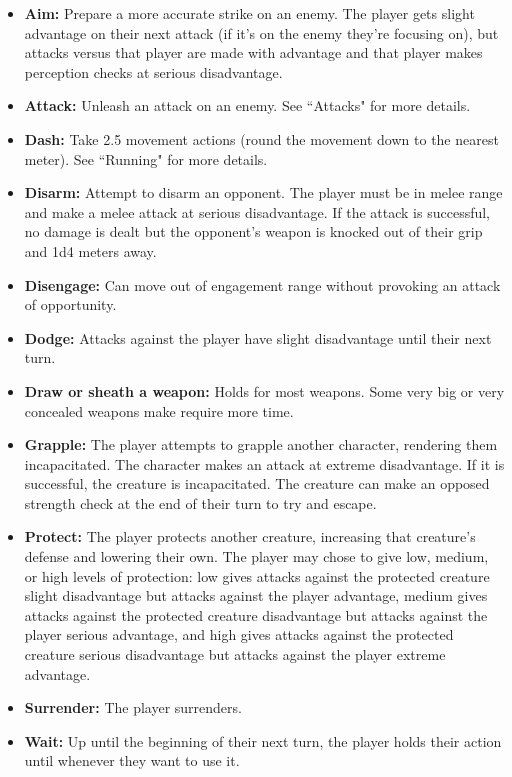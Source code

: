 \documentclass[letterpaper,12pt]{article}
\begin{document}
\begin{itemize}
\item \textbf{Aim:} Prepare a more accurate strike on an enemy. The player gets slight advantage on their next attack (if it's on the enemy they're focusing on), but attacks versus that player are made with advantage and that player makes perception checks at serious disadvantage.
\item \textbf{Attack:} Unleash an attack on an enemy. See ``Attacks" for more details.
\item \textbf{Dash:} Take 2.5 movement actions (round the movement down to the nearest meter). See ``Running" for more details.
\item \textbf{Disarm:} Attempt to disarm an opponent. The player must be in melee range and make a melee attack at serious disadvantage. If the attack is successful, no damage is dealt but the opponent's weapon is knocked out of their grip and 1d4 meters away.
\item \textbf{Disengage:} Can move out of engagement range without provoking an attack of opportunity.
\item \textbf{Dodge:} Attacks against the player have slight disadvantage until their next turn.
\item \textbf{Draw or sheath a weapon:} Holds for most weapons. Some very big or very concealed weapons make require more time. 
\item \textbf{Grapple:} The player attempts to grapple another character, rendering them incapacitated. The character makes an attack at extreme disadvantage. If it is successful, the creature is incapacitated. The creature can make an opposed strength check at the end of their turn to try and escape. 
\item \textbf{Protect:} The player protects another creature, increasing that creature's defense and lowering their own. The player may chose to give low, medium, or high levels of protection: low gives attacks against the protected creature slight disadvantage but attacks against the player advantage, medium gives attacks against the protected creature disadvantage but attacks against the player serious advantage, and high gives attacks against the protected creature serious disadvantage but attacks against the player extreme advantage. 
\item \textbf{Surrender:} The player surrenders.
\item \textbf{Wait:} Up until the beginning of their next turn, the player holds their action until whenever they want to use it.
\end{itemize}
\end{document}
